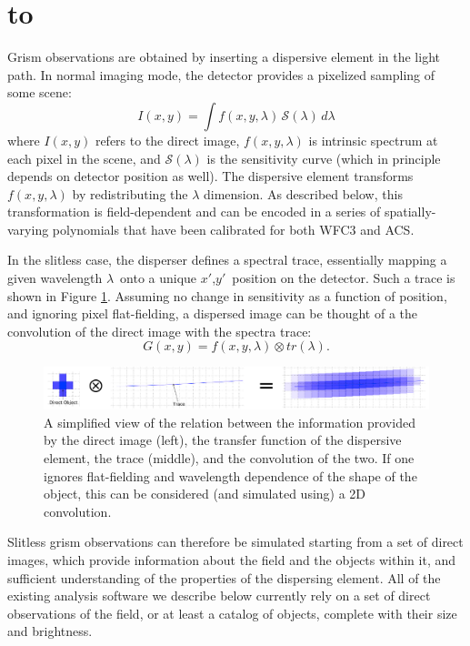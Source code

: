 \documentclass[12pt]{article}
\def\ssection#1{\section{\hbox to \hsize{\large\bf #1\hfill}}}
\begin{document}
\ssection{Grism data}


Grism observations are obtained by inserting a dispersive element in the light path.  In normal imaging mode, the detector provides a pixelized sampling of some scene:
\begin{dmath}
I(x,y) = \int f(x,y,\lambda)\,\mathcal{S}(\lambda)\,d\lambda
\end{dmath}
where $I(x,y)$ refers to the direct image, $f(x,y,\lambda)$ is intrinsic spectrum at each pixel in the scene, and $\mathcal{S}(\lambda)$ is the sensitivity curve (which in principle depends on detector position as well). The dispersive element transforms $f(x,y,\lambda)$ by redistributing the $\lambda$ dimension.  As described below, this transformation is field-dependent and can be encoded in a series of spatially-varying polynomials that have been calibrated for both WFC3 and ACS.

In the slitless case, the disperser defines a spectral trace, essentially mapping a given wavelength $\lambda$\ onto a unique $x'$,$y'$\ position on the detector. Such a trace is shown in Figure \ref{fig:1}. Assuming no change in sensitivity as a function of position, and ignoring pixel flat-fielding, a dispersed image can be thought of a the convolution of the direct image with the spectra trace:
\begin{dmath}
G(x,y) =  f(x,y,\lambda) \otimes tr(\lambda).
\end{dmath}

\begin{figure}[!t]
\centering
\includegraphics[width=\textwidth]{"Figures/Grism_Equation"}
\caption{A simplified view of the relation between the information provided by the direct image (left), the transfer function of the dispersive element, the trace (middle), and the convolution of the two. If one ignores flat-fielding and wavelength dependence of the shape of the object, this can be considered (and simulated using) a 2D convolution.}
\label{fig:1}
\end{figure}

Slitless grism observations can therefore be simulated starting from a set of direct images, which provide information about the field and the objects within it, and sufficient understanding of the properties of the dispersing element.
All of the existing analysis software we describe below currently rely on a set of direct observations of the field, or at least a catalog of objects, complete with their size and brightness. 
\end{document}
